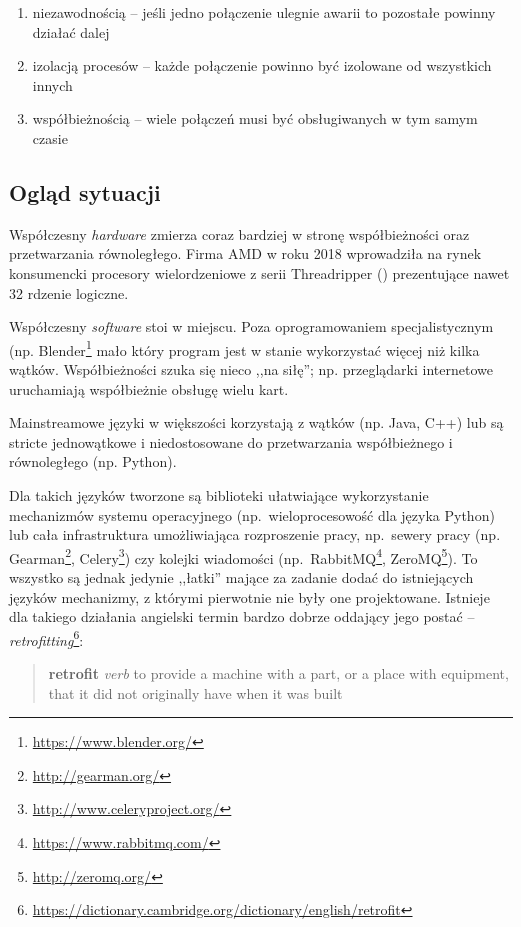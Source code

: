\begin{enumerate}
    \item niezawodnością -- jeśli jedno połączenie ulegnie awarii to pozostałe
        powinny działać dalej
    \item izolacją procesów -- każde połączenie powinno być izolowane od
        wszystkich innych
    \item współbieżnością -- wiele połączeń musi być obsługiwanych w tym samym
        czasie
\end{enumerate}

\subsection{Ogląd sytuacji}

Współczesny \emph{hardware} zmierza coraz bardziej w stronę współbieżności oraz
przetwarzania równoległego.  Firma AMD w roku 2018 wprowadziła na rynek
konsumencki procesory wielordzeniowe z serii Threadripper
(\cite{AmdProductThreadripper}) prezentujące nawet 32 rdzenie logiczne.

Współczesny \emph{software} stoi w miejscu. Poza oprogramowaniem
specjalistycznym (np. Blender\footnote{\url{https://www.blender.org/}} mało
który program jest w stanie wykorzystać więcej niż kilka wątków. Współbieżności
szuka się nieco ,,na siłę''; np. przeglądarki internetowe uruchamiają
współbieżnie obsługę wielu kart.

Mainstreamowe języki w większości korzystają z wątków (np. Java, C++) lub są
stricte jednowątkowe i niedostosowane do przetwarzania współbieżnego i
równoległego (np. Python).

Dla takich języków tworzone są biblioteki ułatwiające wykorzystanie mechanizmów
systemu operacyjnego (np.~wieloprocesowość dla języka Python) lub cała
infrastruktura umożliwiająca rozproszenie pracy, np.~sewery pracy
(np. Gearman\footnote{\url{http://gearman.org/}},
Celery\footnote{\url{http://www.celeryproject.org/}}) czy kolejki wiadomości
(np.~RabbitMQ\footnote{\url{https://www.rabbitmq.com/}},
ZeroMQ\footnote{\url{http://zeromq.org/}}).
To wszystko są jednak jedynie ,,łatki'' mające za zadanie dodać do istniejących
języków mechanizmy, z którymi pierwotnie nie były one projektowane. Istnieje dla
takiego działania angielski termin bardzo dobrze oddający jego postać --
\emph{retrofitting}\footnote{\url{https://dictionary.cambridge.org/dictionary/english/retrofit}}:

\begin{quote}
    \textbf{retrofit}
    \newline
    \emph{verb}
    \newline
    to provide a machine with a part, or a place with equipment, that it did not
    originally have when it was built
\end{quote}

